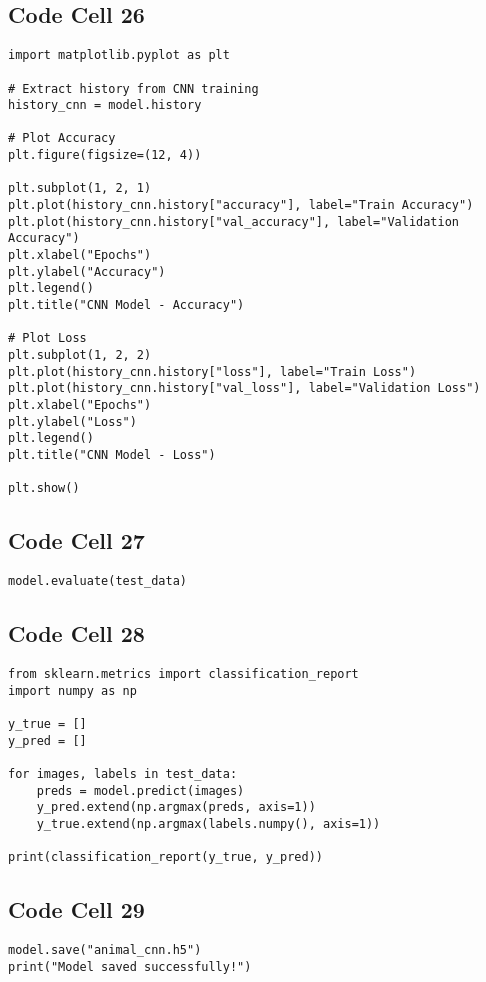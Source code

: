 \documentclass{article}
\begin{document}
\subsection*{Code Cell 26}
\begin{lstlisting}
import matplotlib.pyplot as plt

# Extract history from CNN training
history_cnn = model.history

# Plot Accuracy
plt.figure(figsize=(12, 4))

plt.subplot(1, 2, 1)
plt.plot(history_cnn.history["accuracy"], label="Train Accuracy")
plt.plot(history_cnn.history["val_accuracy"], label="Validation Accuracy")
plt.xlabel("Epochs")
plt.ylabel("Accuracy")
plt.legend()
plt.title("CNN Model - Accuracy")

# Plot Loss
plt.subplot(1, 2, 2)
plt.plot(history_cnn.history["loss"], label="Train Loss")
plt.plot(history_cnn.history["val_loss"], label="Validation Loss")
plt.xlabel("Epochs")
plt.ylabel("Loss")
plt.legend()
plt.title("CNN Model - Loss")

plt.show()

\end{lstlisting}

\subsection*{Code Cell 27}
\begin{lstlisting}
model.evaluate(test_data)
\end{lstlisting}

\subsection*{Code Cell 28}
\begin{lstlisting}
from sklearn.metrics import classification_report
import numpy as np

y_true = []
y_pred = []

for images, labels in test_data:
    preds = model.predict(images)
    y_pred.extend(np.argmax(preds, axis=1))
    y_true.extend(np.argmax(labels.numpy(), axis=1))

print(classification_report(y_true, y_pred))
\end{lstlisting}

\subsection*{Code Cell 29}
\begin{lstlisting}
model.save("animal_cnn.h5")
print("Model saved successfully!")
\end{lstlisting}
\end{document}

